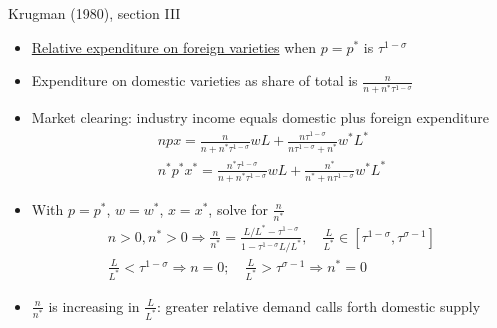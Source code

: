 \documentclass[10pt,notes=hide]{beamer}
\begin{document}
\begin{frame}{Krugman (1980), section III}
\begin{itemize}
	\item \href{http://www.columbia.edu/~jid2106/td/dixitstiglitzbasics.pdf}{Relative expenditure on foreign varieties} when $p=p^*$ is $\tau^{1-\sigma}$
	\item Expenditure on domestic varieties as share of total is $\frac{n}{n + n^*\tau^{1-\sigma}}$
	\item Market clearing: industry income equals domestic plus foreign expenditure
	\begin{align*}
	npx = \frac{n}{n + n^*\tau^{1-\sigma}} w L + \frac{n\tau^{1-\sigma}}{n\tau^{1-\sigma} + n^*} w^* L^* \\
	n^*p^*x^* = \frac{n^*\tau^{1-\sigma}}{n + n^*\tau^{1-\sigma}} w L + \frac{n^*}{n^* + n\tau^{1-\sigma}} w^* L^*
	\end{align*}
	\item With $p=p^*$, $w=w^*$, $x=x^*$, solve for $\frac{n}{n^*}$
	\begin{align*}
	n>0,n^*>0 \Rightarrow \frac{n}{n^*} = \frac{L/L^* - \tau^{1-\sigma}}{1 - \tau^{1-\sigma}L/L^*}, \quad \frac{L}{L^*} \in [\tau^{1-\sigma},\tau^{\sigma-1}] \\
	 \frac{L}{L^*} < \tau^{1-\sigma} \Rightarrow n = 0 ; \quad \frac{L}{L^*} > \tau^{\sigma-1} \Rightarrow n^* = 0 
	\end{align*}
	\item $\frac{n}{n^*}$ is increasing in $\frac{L}{L^*}$: greater relative demand calls forth domestic supply
\end{itemize}
\end{frame}
\end{document}
